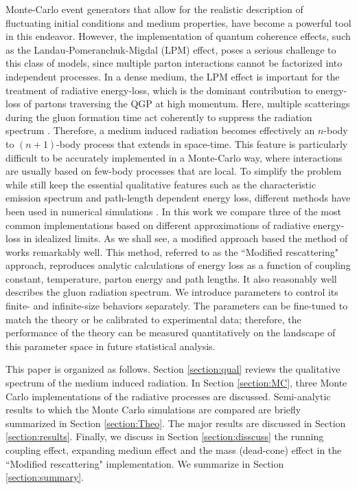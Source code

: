 \documentclass[aps, prc, reprint, amsmath, groupedaddress, nofootinbib]{revtex4-1}
\begin{document}
Monte-Carlo event generators that allow for the realistic description of fluctuating initial conditions and medium properties, have become a powerful tool in this endeavor. 
However, the implementation of quantum coherence effects, such as the Landau-Pomeranchuk-Migdal (LPM) effect, poses a serious challenge to this class of models, since multiple parton interactions cannot be factorized into independent processes. 
In a dense medium, the LPM effect is important for the treatment of radiative energy-loss, which is the dominant contribution to energy-loss of partons traversing the QGP at high momentum.
Here, multiple scatterings during the gluon formation time act coherently to suppress the radiation spectrum \cite{PhysRev.103.1811,Wang:1994fx,Zakharov:1996fv,Baier:1996kr}.
Therefore, a medium induced radiation becomes effectively an $n$-body to $(n+1)$-body process that extends in space-time.
This feature is particularly difficult to be accurately implemented in a Monte-Carlo way, where interactions are usually based on few-body processes that are local.
To simplify the problem while still keep the essential qualitative features such as the characteristic emission spectrum and path-length dependent energy loss, different methods have been used in numerical simulations \cite{Djordjevic:2008iz,Cao:2013ita,ColemanSmith:2012vr,Xu:2004mz,Zapp:2011ya,Gossiaux:2012cv,Park:thesis}.
In this work we compare three of the most common implementations based on different approximations of radiative energy-loss in idealized limits.
As we shall see, a modified approach based the method of \cite{Zapp:2011ya} works remarkably well.
This method, referred to as the ``Modified rescattering" approach, reproduces  analytic calculations of energy loss as a function of coupling constant, temperature, parton energy and path lengths.
It also reasonably well describes the gluon radiation spectrum.
We introduce parameters to control its finite- and infinite-size behaviors separately.
The parameters can be fine-tuned to match the theory or be calibrated to experimental data;
therefore, the performance of the theory can be measured quantitatively on the landscape of this parameter space in future statistical analysis.

This paper is organized as follows. Section \ref{section:qual} reviews the qualitative spectrum of the medium induced radiation.
In Section \ref{section:MC}, three Monte Carlo implementations of the radiative processes are discussed. 
Semi-analytic results to which the Monte Carlo simulations are compared are briefly summarized in Section \ref{section:Theo}.
The major results are discussed in Section \ref{section:results}.
Finally, we discuss in Section \ref{section:disscuss} the running coupling effect, expanding medium effect and the mass (dead-cone) effect in the ``Modified rescattering" implementation. We summarize in Section \ref{section:summary}.
\end{document}
